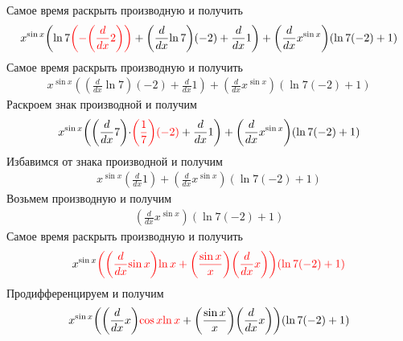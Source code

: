 \documentclass{article}
\begin{document}
\begin{center}
Самое время раскрыть производную и получить\begin{gather*}
{{{{x}^{\sin{{x}}}}{\left({{\ln{{7}}}{\color{red}{{\left(-{\left({\frac{{d}}{{d{{x}}}}}{{2}}\right)}\right)}}}}+{{{\left({\frac{{d}}{{d{{x}}}}}{{\ln{{7}}}}\right)}{\left(-{2}\right)}}+{{\frac{{d}}{{d{{x}}}}}{{1}}}}\right)}}+{{\left({\frac{{d}}{{d{{x}}}}}{{{x}^{\sin{{x}}}}}\right)}{\left({{\ln{{7}}}{\left(-{2}\right)}}+{1}\right)}}}\end{gather*}
Самое время раскрыть производную и получить\begin{gather*}
{{{{x}^{\sin{{x}}}}{\left({{\left({\frac{{d}}{{d{{x}}}}}{{\ln{{7}}}}\right)}{\left(-{2}\right)}}+{{\frac{{d}}{{d{{x}}}}}{{1}}}\right)}}+{{\left({\frac{{d}}{{d{{x}}}}}{{{x}^{\sin{{x}}}}}\right)}{\left({{\ln{{7}}}{\left(-{2}\right)}}+{1}\right)}}}\end{gather*}
Раскроем знак производной и получим\begin{gather*}
{{{{x}^{\sin{{x}}}}{\left({{\left({\frac{{d}}{{d{{x}}}}}{{7}}\right)}{\cdot}{\color{red}{{{\left(\frac{{1}}{{7}}\right)}{\left(-{2}\right)}}}}}+{{\frac{{d}}{{d{{x}}}}}{{1}}}\right)}}+{{\left({\frac{{d}}{{d{{x}}}}}{{{x}^{\sin{{x}}}}}\right)}{\left({{\ln{{7}}}{\left(-{2}\right)}}+{1}\right)}}}\end{gather*}
Избавимся от знака производной и получим\begin{gather*}
{{{{x}^{\sin{{x}}}}{\left({\frac{{d}}{{d{{x}}}}}{{1}}\right)}}+{{\left({\frac{{d}}{{d{{x}}}}}{{{x}^{\sin{{x}}}}}\right)}{\left({{\ln{{7}}}{\left(-{2}\right)}}+{1}\right)}}}\end{gather*}
Возьмем производную и получим\begin{gather*}
{{\left({\frac{{d}}{{d{{x}}}}}{{{x}^{\sin{{x}}}}}\right)}{\left({{\ln{{7}}}{\left(-{2}\right)}}+{1}\right)}}\end{gather*}
Самое время раскрыть производную и получить\begin{gather*}
{{{x}^{\sin{{x}}}}{\color{red}{{{\left({{\left({\frac{{d}}{{d{{x}}}}}{{\sin{{x}}}}\right)}{\ln{{x}}}}+{{\left(\frac{{\sin{{x}}}}{{x}}\right)}{\left({\frac{{d}}{{d{{x}}}}}{{x}}\right)}}\right)}{\left({{\ln{{7}}}{\left(-{2}\right)}}+{1}\right)}}}}}\end{gather*}
Продифференцируем и получим\begin{gather*}
{{{x}^{\sin{{x}}}}{{\left({{\left({\frac{{d}}{{d{{x}}}}}{{x}}\right)}{\color{red}{{{\cos{{x}}}{\ln{{x}}}}}}}+{{\left(\frac{{\sin{{x}}}}{{x}}\right)}{\left({\frac{{d}}{{d{{x}}}}}{{x}}\right)}}\right)}{\left({{\ln{{7}}}{\left(-{2}\right)}}+{1}\right)}}}\end{gather*}

\end{center}
\end{document}
